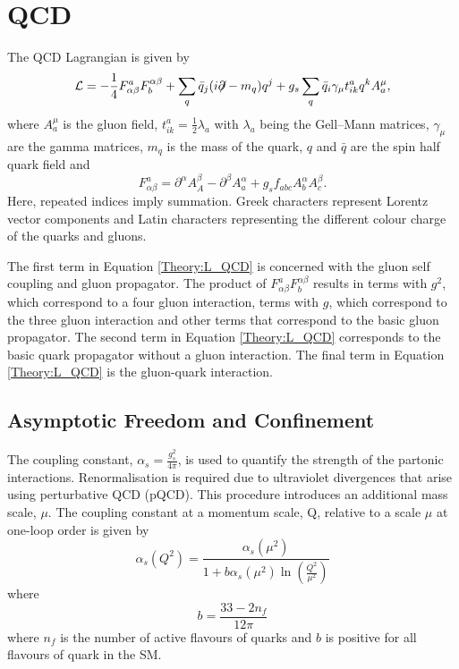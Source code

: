 \section{QCD}
\label{Theory:QCD}
The QCD Lagrangian is given by 
\begin{equation}
\mathcal{L} = - \frac{1}{4} F^{a}_{\alpha\beta} F_{b}^{\alpha\beta} + \sum_{q} \bar{q}_{j}( i{\not}\partial - m_{q})q^{j}  + g_s\sum_{q} \bar{q}_{i}\gamma_{\mu} t^{a}_{ik} q^{k} A^{\mu}_{a}, 
\label{Theory:L_QCD}
\end{equation}
where $A^{\mu}_{a}$ is the gluon field, $t^{a}_{ik}=\frac{1}{2}\lambda_{a}$ with $\lambda_{a}$ being the Gell--Mann matrices, $\gamma_{\mu}$ are the gamma matrices, $m_{q}$ is the mass of the quark, $q$ and $\bar{q}$ are the spin half quark field and 
\begin{equation}
F^{a}_{\alpha\beta} = \partial^{\alpha}A_{A}^{\beta} - \partial^{\beta}A_{a}^{\alpha} + g_s f_{abc} A_{b}^{\alpha}A_{c}^{\beta}. 
\label{Theory:F_Tensor}
\end{equation}
Here, repeated indices imply summation. 
Greek characters represent Lorentz vector components and Latin characters representing the different colour charge of the quarks and gluons. 

The first term in Equation \ref{Theory:L_QCD} is concerned with the gluon self coupling and gluon propagator. 
The product of $F^{a}_{\alpha\beta} F_{b}^{\alpha\beta}$ results in terms with $g^2$, which correspond to a four gluon interaction, terms with $g$, which correspond to the three gluon interaction and other terms that correspond to the basic gluon propagator.
The second term in Equation \ref{Theory:L_QCD} corresponds to the basic quark propagator without a gluon interaction.
The final term in Equation \ref{Theory:L_QCD} is the gluon-quark interaction.

\subsection{Asymptotic Freedom and Confinement}


The coupling constant, $\alpha_{s} = \frac{g_s^2}{4\pi}$, is used to quantify the strength of the partonic interactions.
Renormalisation is required due to ultraviolet divergences that arise using perturbative QCD (pQCD). 
This procedure introduces an additional mass scale, $\mu$.
The coupling constant at a momentum scale, Q, relative to a scale $\mu$ at one-loop order is given by
\begin{equation}
\alpha_{s}(Q^2) = \frac{\alpha_{s}(\mu^2)}{1+b\alpha_{s}(\mu^2)\ln(\frac{Q^2}{\mu^2})}
\label{Theory:Coupling}
\end{equation}
where 
\begin{equation}
b = \frac{33-2n_f}{12\pi}
\label{Theory:b_Coupling}
\end{equation}
where $n_f$ is the number of active flavours of quarks and $b$ is positive for all flavours of quark in the SM.

